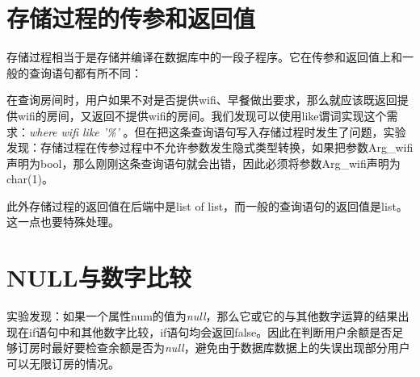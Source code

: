 \documentclass{myreport}
\begin{document}
\section{存储过程的传参和返回值}
存储过程相当于是存储并编译在数据库中的一段子程序。它在传参和返回值上和一般的查询语句都有所不同：

在查询房间时，用户如果不对是否提供wifi、早餐做出要求，那么就应该既返回提供wifi的房间，又返回不提供wifi的房间。我们发现可以使用like谓词实现这个需求：\textit{where \space wifi \space like \space '\%'} 。但在把这条查询语句写入存储过程时发生了问题，实验发现：存储过程在传参过程中不允许参数发生隐式类型转换，如果把参数Arg\_wifi声明为bool，那么刚刚这条查询语句就会出错，因此必须将参数Arg\_wifi声明为char(1)。

此外存储过程的返回值在后端中是list of list，而一般的查询语句的返回值是list。这一点也要特殊处理。


\section{NULL与数字比较}
实验发现：如果一个属性num的值为\textit{null}，那么它或它的与其他数字运算的结果出现在if语句中和其他数字比较，if语句均会返回false。因此在判断用户余额是否足够订房时最好要检查余额是否为\textit{null}，避免由于数据库数据上的失误出现部分用户可以无限订房的情况。



% 
% 

\appendix


\cleardoublepage
\end{document}
